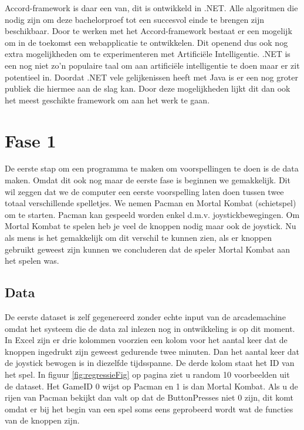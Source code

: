 Accord-framework is daar een van, dit is ontwikkeld in .NET. Alle algoritmen die nodig zijn om deze bachelorproef tot een succesvol einde te brengen zijn beschikbaar. \newline
Door te werken met het Accord-framework bestaat er een mogelijk om in de toekomst een webapplicatie te ontwikkelen. Dit openend dus ook nog extra mogelijkheden om te experimenteren met Artificiële Intelligentie. 
\newline
.NET is een nog niet zo'n populaire taal om aan artificiële intelligentie te doen maar er zit potentieel in. Doordat .NET vele gelijkenissen heeft met Java is er een nog groter publiek die hiermee aan de slag kan.
\newline
Door deze mogelijkheden lijkt dit dan ook het meest geschikte framework om aan het werk te gaan. 

\section{Fase 1}
\label{sec:Fase1}
De eerste stap om een programma te maken om voorspellingen te doen is de data maken. Omdat dit ook nog maar de eerste fase is beginnen we gemakkelijk. Dit wil zeggen dat we de computer een eerste voorspelling laten doen tussen twee totaal verschillende spelletjes. We nemen Pacman en Mortal Kombat (schietspel) om te starten. Pacman kan gespeeld worden enkel d.m.v. joystickbewegingen. Om Mortal Kombat te spelen heb je veel de knoppen nodig maar ook de joystick.  Nu als mens is het gemakkelijk om dit verschil te kunnen zien, als er knoppen gebruikt geweest zijn kunnen we concluderen dat de speler Mortal Kombat aan het spelen was. 

\subsection{Data}
\label{sec:DataFase1}
De eerste dataset is zelf gegenereerd zonder echte input van de arcademachine omdat het systeem die de data zal inlezen nog in ontwikkeling is op dit moment. 
In Excel zijn er drie kolommen voorzien een kolom voor het aantal keer dat de knoppen ingedrukt zijn geweest gedurende twee minuten. Dan het aantal keer dat de joystick bewogen is in diezelfde tijdsspanne. De derde kolom staat het ID van het spel. 
In figuur \ref{fig:regressieFig} op pagina \pageref{fig:regressieFig} ziet u random 10 voorbeelden uit de dataset.
Het GameID 0 wijst op Pacman en 1 is dan Mortal Kombat. Als u de rijen van Pacman bekijkt dan valt op dat de ButtonPresses niet 0 zijn, dit komt omdat er bij het begin van een spel soms eens geprobeerd wordt wat de functies van de knoppen zijn. 

